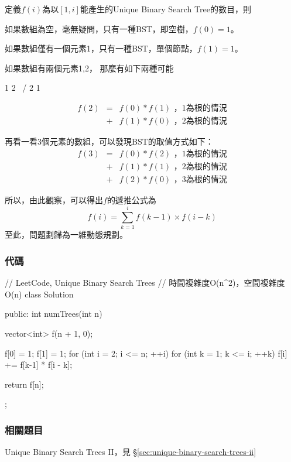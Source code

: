 定義$f(i)$為以$[1,i]$能產生的Unique Binary Search Tree的數目，則

如果數組為空，毫無疑問，只有一種BST，即空樹，$f(0)=1$。

如果數組僅有一個元素{1}，只有一種BST，單個節點，$f(1)=1$。

如果數組有兩個元素{1,2}， 那麼有如下兩種可能
\begin{Code}
1             2
  \          /
    2      1
\end{Code}

\begin{eqnarray}
f(2) &=& f(0) * f(1)   \text{ ，1為根的情況} \nonumber \\
     &+& f(1) * f(0)   \text{ ，2為根的情況} \nonumber
\end{eqnarray}

再看一看3個元素的數組，可以發現BST的取值方式如下：
\begin{eqnarray}
f(3) &=& f(0) * f(2)   \text{ ，1為根的情況} \nonumber \\
     &+& f(1) * f(1)   \text{ ，2為根的情況} \nonumber \\
     &+& f(2) * f(0)   \text{ ，3為根的情況} \nonumber
\end{eqnarray}

所以，由此觀察，可以得出$f$的遞推公式為
$$
f(i) = \sum_{k=1}^{i} f(k-1) \times f(i-k)
$$
至此，問題劃歸為一維動態規劃。


\subsubsection{代碼}

\begin{Code}
// LeetCode, Unique Binary Search Trees
// 時間複雜度O(n^2)，空間複雜度O(n)
class Solution {
public:
    int numTrees(int n) {
        vector<int> f(n + 1, 0);

        f[0] = 1;
        f[1] = 1;
        for (int i = 2; i <= n; ++i) {
            for (int k = 1; k <= i; ++k)
                f[i] += f[k-1] * f[i - k];
        }

        return f[n];
    }
};
\end{Code}


\subsubsection{相關題目}
\begindot
\item Unique Binary Search Trees II，見 \S \ref{sec:unique-binary-search-trees-ii}
\myenddot


